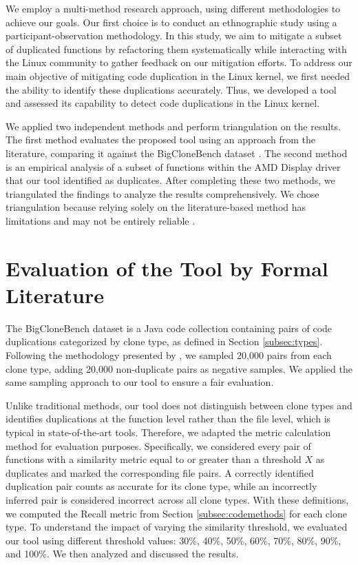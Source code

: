 We employ a multi-method research approach, using different methodologies to achieve our goals. Our first choice is to conduct an ethnographic study using a participant-observation methodology. In this study, we aim to mitigate a subset of duplicated functions by refactoring them systematically while interacting with the Linux community to gather feedback on our mitigation efforts. To address our main objective of mitigating code duplication in the Linux kernel, we first needed the ability to identify these duplications accurately. Thus, we developed a tool and assessed its capability to detect code duplications in the Linux kernel.

We applied two independent methods and perform triangulation on the results. 
The first method evaluates the proposed tool using an approach from the literature, 
comparing it against the BigCloneBench dataset \citep{bigclonebench}. 
The second method is an empirical analysis of a subset of functions within the 
AMD Display driver that our tool identified as duplicates. After completing these two 
methods, we triangulated the findings to analyze the results comprehensively. 
We chose triangulation because relying solely on the literature-based method has 
limitations and may not be entirely reliable \citep{bigfail, litreview}.

\section{Evaluation of the Tool by Formal Literature}

\label{sec:metbig}

The BigCloneBench dataset \citep{bigclonebench} is a Java code collection containing pairs of code duplications categorized by clone type, as defined in Section \ref{subsec:types}.
%
Following the methodology presented by \citep{tailor}, we sampled 20,000 pairs from each clone type, adding 20,000 non-duplicate pairs as negative samples. We applied the same sampling approach to our tool to ensure a fair evaluation.

Unlike traditional methods, our tool does not distinguish between clone types and identifies duplications at the function level rather than the file level, which is typical in state-of-the-art tools. Therefore, we adapted the metric calculation method for evaluation purposes. Specifically, we considered every pair of functions with a similarity metric equal to or greater than a threshold \(X\) as duplicates and marked the corresponding file pairs. A correctly identified duplication pair counts as accurate for its clone type, while an incorrectly inferred pair is considered incorrect across all clone types. With these definitions, we computed the Recall metric from Section \ref{subsec:codemethods} for each clone type.
%
To understand the impact of varying the similarity threshold, we evaluated our tool using different threshold values: 30\%, 40\%, 50\%, 60\%, 70\%, 80\%, 90\%, and 100\%. We then analyzed and discussed the results.

